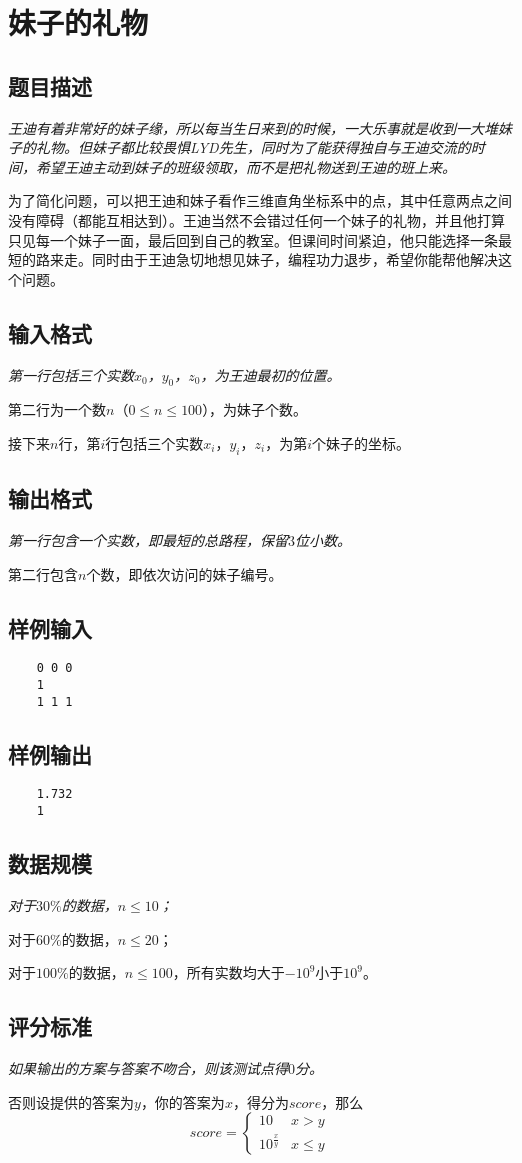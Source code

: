 \section{妹子的礼物}
\subsection{题目描述}
{\itshape 王迪有着非常好的妹子缘，所以每当生日来到的时候，一大乐事就是收到一大堆妹子的礼物。但妹子都比较畏惧LYD先生，同时为了能获得独自与王迪交流的时间，希望王迪主动到妹子的班级领取，而不是把礼物送到王迪的班上来。
\par 为了简化问题，可以把王迪和妹子看作三维直角坐标系中的点，其中任意两点之间没有障碍（都能互相达到）。王迪当然不会错过任何一个妹子的礼物，并且他打算只见每一个妹子一面，最后回到自己的教室。但课间时间紧迫，他只能选择一条最短的路来走。同时由于王迪急切地想见妹子，编程功力退步，希望你能帮他解决这个问题。
}
\subsection{输入格式}
{\itshape
第一行包括三个实数$x_0$，$y_0$，$z_0$，为王迪最初的位置。
\par 第二行为一个数$n$（$0 \le n \le 100$），为妹子个数。
\par 接下来$n$行，第$i$行包括三个实数$x_i$，$y_i$，$z_i$，为第$i$个妹子的坐标。}
\subsection{输出格式}
{\itshape
第一行包含一个实数，即最短的总路程，保留$3$位小数。
\par 第二行包含$n$个数，即依次访问的妹子编号。}
\subsection{样例输入}
\begin{verbatim}
	0 0 0 
	1 
	1 1 1 
\end{verbatim}
\subsection{样例输出}
\begin{verbatim}
	1.732
	1
\end{verbatim}

\subsection{数据规模}
{\itshape
对于$30\%$的数据，$n \le 10$；\par
对于$60\%$的数据，$n \le 20$；\par
对于$100\%$的数据，$n \le 100$，所有实数均大于$-10^9$小于$10^9$。
}
\subsection{评分标准}
{\itshape
	如果输出的方案与答案不吻合，则该测试点得$0$分。\par
	否则设提供的答案为$y$，你的答案为$x$，得分为$score$，那么
	\begin{displaymath}
	score = \left\{ \begin{array}{ll}
		10 & x > y \\
		10^{\frac{x}{y}} & x \le y \end{array}
		\right.
	\end{displaymath}
}
